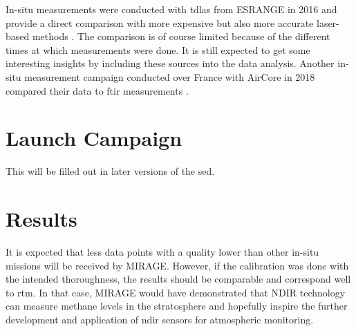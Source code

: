 \documentclass[
  a4paper,
  11pt,
  openany,
  parskip,
  toc=totoc,
  listof=totoc,
  bibliography=totoc
]{scrreprt}
\begin{document}
In-situ measurements were conducted with \gls{tdlas} from ESRANGE in 2016 and provide a direct comparison with more expensive but also more accurate laser-based methods \cite{Khair2017}.
The comparison is of course limited because of the different times at which measurements were done.
It is still expected to get some interesting insights by including these sources into the data analysis.
Another in-situ measurement campaign conducted over France with AirCore in 2018 compared their data to \gls{ftir} measurements \cite{RINGO}.


\section{Launch Campaign}

This will be filled out in later versions of the \gls{sed}.

\section{Results}

It is expected that less data points with a quality lower than other in-situ missions will be received by MIRAGE. However, if the calibration was done with the intended thoroughness, the results should be comparable and correspond well to \gls{rtm}. In that case, MIRAGE would have demonstrated that NDIR technology can measure methane levels in the stratosphere and hopefully inspire the further development and application of \gls{ndir} sensors for atmospheric monitoring.
\end{document}
